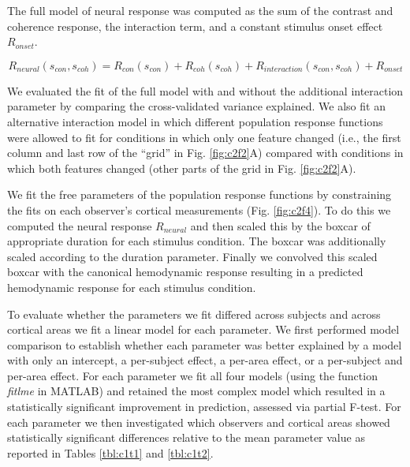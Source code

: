 The full model of neural response was computed as the sum of the contrast and coherence response, the interaction term, and a constant stimulus onset effect $R_{onset}$.

\begin{equation}
    R_{neural}(s_{con},s_{coh})=R_{con}(s_{con})+R_{coh}(s_{coh})+R_{interaction}(s_{con},s_{coh})+R_{onset}
\end{equation}

We evaluated the fit of the full model with and without the additional interaction parameter by comparing the cross-validated variance explained. We also fit an alternative interaction model in which different population response functions were allowed to fit for conditions in which only one feature changed (i.e., the first column and last row of the “grid” in Fig. \ref{fig:c2f2}A) compared with conditions in which both features changed (other parts of the grid in Fig. \ref{fig:c2f2}A).

We fit the free parameters of the population response functions by constraining the fits on each observer’s cortical measurements (Fig. \ref{fig:c2f4}). To do this we computed the neural response $R_{neural}$ and then scaled this by the boxcar of appropriate duration for each stimulus condition. The boxcar was additionally scaled according to the duration parameter. Finally we convolved this scaled boxcar with the canonical hemodynamic response resulting in a predicted hemodynamic response for each stimulus condition.

To evaluate whether the parameters we fit differed across subjects and across cortical areas we fit a linear model for each parameter. We first performed model comparison to establish whether each parameter was better explained by a model with only an intercept, a per-subject effect, a per-area effect, or a per-subject and per-area effect. For each parameter we fit all four models (using the function \textit{fitlme} in MATLAB) and retained the most complex model which resulted in a statistically significant improvement in prediction, assessed via partial F-test. For each parameter we then investigated which observers and cortical areas showed statistically significant differences relative to the mean parameter value as reported in Tables \ref{tbl:c1t1} and \ref{tbl:c1t2}.

